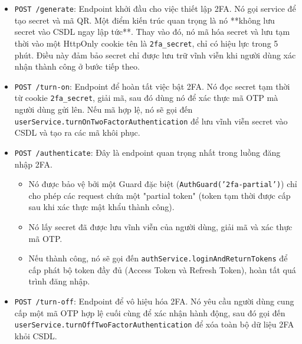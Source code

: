 \begin{itemize}
    \item \texttt{POST /generate}: Endpoint khởi đầu cho việc thiết lập 2FA. Nó gọi service để tạo secret và mã QR. Một điểm kiến trúc quan trọng là nó **không lưu secret vào CSDL ngay lập tức**. Thay vào đó, nó mã hóa secret và lưu tạm thời vào một HttpOnly cookie tên là \texttt{2fa\_secret}, chỉ có hiệu lực trong 5 phút. Điều này đảm bảo secret chỉ được lưu trữ vĩnh viễn khi người dùng xác nhận thành công ở bước tiếp theo.
    
    \item \texttt{POST /turn-on}: Endpoint để hoàn tất việc bật 2FA. Nó đọc secret tạm thời từ cookie \texttt{2fa\_secret}, giải mã, sau đó dùng nó để xác thực mã OTP mà người dùng gửi lên. Nếu mã hợp lệ, nó sẽ gọi đến \texttt{userService.turnOnTwoFactorAuthentication} để lưu vĩnh viễn secret vào CSDL và tạo ra các mã khôi phục.
    
    \item \texttt{POST /authenticate}: Đây là endpoint quan trọng nhất trong luồng đăng nhập 2FA.
    \begin{itemize}
        \item Nó được bảo vệ bởi một Guard đặc biệt (\texttt{AuthGuard('2fa-partial')}) chỉ cho phép các request chứa một "partial token" (token tạm thời được cấp sau khi xác thực mật khẩu thành công).
        \item Nó lấy secret đã được lưu vĩnh viễn của người dùng, giải mã và xác thực mã OTP.
        \item Nếu thành công, nó sẽ gọi đến \texttt{authService.loginAndReturnTokens} để cấp phát bộ token đầy đủ (Access Token và Refresh Token), hoàn tất quá trình đăng nhập.
    \end{itemize}
    
    \item \texttt{POST /turn-off}: Endpoint để vô hiệu hóa 2FA. Nó yêu cầu người dùng cung cấp một mã OTP hợp lệ cuối cùng để xác nhận hành động, sau đó gọi đến \texttt{userService.turnOffTwoFactorAuthentication} để xóa toàn bộ dữ liệu 2FA khỏi CSDL.
\end{itemize}


